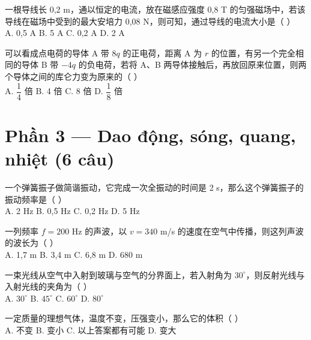 \documentclass[11pt, a4paper]{article}
\begin{document}
\begin{baitap}[13]
一根导线长 0,2 m，通以恒定的电流，放在磁感应强度 0,8 T 的匀强磁场中，若该导线在磁场中受到的最大安培力 0,08 N，则可知，通过导线的电流大小是（ ）\\[4pt]
A. 0,5 A \quad B. 5 A \quad C. 0,2 A \quad D. 2 A
\end{baitap}

\begin{baitap}[14]
可以看成点电荷的导体 A 带 $8q$ 的正电荷，距离 A 为 $r$ 的位置，有另一个完全相同的导体 B 带 $-4q$ 的负电荷，若将 A、B 两导体接触后，再放回原来位置，则两个导体之间的库仑力变为原来的（ ）\\[4pt]
A. $\dfrac{1}{4}$ 倍 \quad B. 4 倍 \quad C. 8 倍 \quad D. $\dfrac{1}{8}$ 倍
\end{baitap}

\section*{Phần 3 — Dao động, sóng, quang, nhiệt (6 câu)}

\begin{baitap}[15]
一个弹簧振子做简谐振动，它完成一次全振动的时间是 2 s，那么这个弹簧振子的振动频率是（ ）\\[4pt]
A. 2 Hz \quad B. 0,5 Hz \quad C. 0,2 Hz \quad D. 5 Hz
\end{baitap}

\begin{baitap}[16]
一列频率 $f=200$ Hz 的声波，以 $v=340$ m/s 的速度在空气中传播，则这列声波的波长为（ ）\\[4pt]
A. 1,7 m \quad B. 3,4 m \quad C. 6,8 m \quad D. 680 m
\end{baitap}

\begin{baitap}[17]
一束光线从空气中入射到玻璃与空气的分界面上，若入射角为 $30^\circ$，则反射光线与入射光线的夹角为（ ）\\[4pt]
A. $30^\circ$ \quad B. $45^\circ$ \quad C. $60^\circ$ \quad D. $80^\circ$
\end{baitap}

\begin{baitap}[18]
一定质量的理想气体，温度不变，压强变小，那么它的体积（ ）\\[4pt]
A. 不变 \quad B. 变小 \quad C. 以上答案都有可能 \quad D. 变大
\end{baitap}
\end{document}
